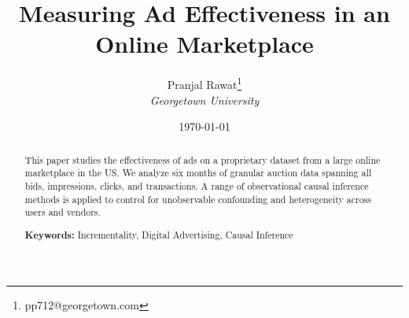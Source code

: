 \documentclass[12pt,a4paper]{article}
\title{Measuring Ad Effectiveness in an Online Marketplace}
\author{
    Pranjal Rawat\footnote{pp712@georgetown.com}\\
    \textit{Georgetown University}
}
\date{\today}
\begin{document}
\maketitle

\begin{abstract}
\noindent This paper studies the effectiveness of ads on a proprietary dataset from a large online marketplace in the US. 
We analyze six months of granular auction data spanning all bids, impressions, clicks, and transactions. 
A range of observational causal inference methods is applied to control for unobservable confounding and heterogeneity across users and vendors. 

\vspace{0.5cm}
\noindent \textbf{Keywords:} Incrementality, Digital Advertising, Causal Inference
\end{abstract}








%
%
%
%

\end{document}
